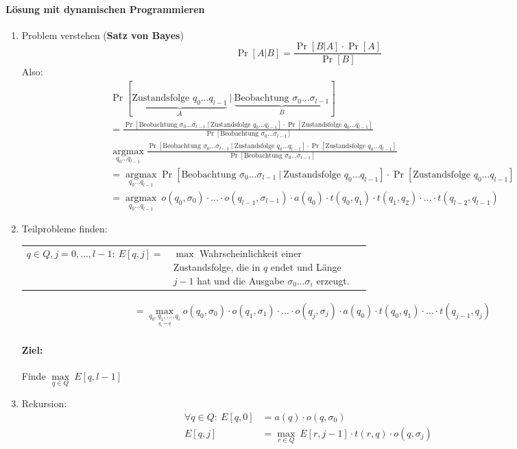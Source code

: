 \paragraph*{Lösung mit dynamischen Programmieren}
\begin{enumerate}[start=0]
\item Problem verstehen (\textbf{Satz von Bayes})
     \[\operatorname{Pr}[A|B] = \frac{\operatorname{Pr}[B|A] \cdot \operatorname{Pr}[A]}{\operatorname{Pr}[B]}\]
     Also:
     \begin{align*}
     &\operatorname{Pr}[\underbrace{\text{Zustandsfolge $q_0...q_{l-1}$}}_{A}\ |\ \underbrace{\text{Beobachtung $\sigma_0...\sigma_{l-1}$}}_{B}] \\&= \frac{\operatorname{Pr}[\text{Beobachtung $\sigma_0...\sigma_{l-1}$}\ |\ \text{Zustandsfolge $q_0...q_{l-1}$}] \cdot \operatorname{Pr}[\text{Zustandsfolge $q_0...q_{l-1}$}]}{\operatorname{Pr}[\text{Beobachtung $\sigma_0...\sigma_{l-1}$}]}\\
     &\underset{q_0...q_{l-1}}{\operatorname{argmax}} \frac{\operatorname{Pr}[\text{Beobachtung $\sigma_0...\sigma_{l-1}$}\ |\ \text{Zustandsfolge $q_0...q_{l-1}$}] \cdot \operatorname{Pr}[\text{Zustandsfolge $q_0...q_{l-1}$}]}{\operatorname{Pr}[\text{Beobachtung $\sigma_0...\sigma_{l-1}$}]} \\
     &= \underset{q_0...q_{l-1}}{\operatorname{argmax}} \operatorname{Pr}[\text{Beobachtung $\sigma_0...\sigma_{l-1}$}\ |\ \text{Zustandsfolge $q_0...q_{l-1}$}] \cdot \operatorname{Pr}[\text{Zustandsfolge $q_0...q_{l-1}$}]\\
     &= \underset{q_0...q_{l-1}}{\operatorname{argmax}}\ o(q_0,\sigma_0) \cdot ... \cdot o(q_{l-1},\sigma_{l-1}) \cdot a(q_0) \cdot 
         t(q_0,q_1) \cdot t(q_1,q_2) \cdot ... \cdot t(q_{l-2}, q_{l-1})
     \end{align*}
\item Teilprobleme finden:
\begin{center}
    \begin{tabular}{rp{0.6\linewidth}}
        $q \in Q, j = 0, ..., l-1{:}\ E[q,j] =$&$\max$ Wahrscheinlichkeit einer Zustandsfolge, die in $q$ endet und Länge $j-1$ hat und die Ausgabe $\sigma_0...\sigma_i$ erzeugt.
     \end{tabular}
\end{center}
\begin{align*}
 &= \underset{\underset{q_i = q}{q_0,q_1,...,q_i}}{\max} o(q_0,\sigma_0) \cdot o(q_1,\sigma_1) \cdot ... \cdot o(q_j, \sigma_j)
     \cdot a(q_0) \cdot t(q_0,q_1) \cdot ... \cdot t(q_{j-1}, q_j)
\end{align*}
\paragraph*{Ziel:} Finde $\underset{q \in Q}{\max}\ E[q, l-1]$
\item Rekursion:
 \begin{align*}
  \forall q \in Q{:}\ E[q, 0] &= a(q) \cdot o (q, \sigma_0) \\
                      E[q, j] &= \max\limits_{r \in Q}\ E[r, j-1] \cdot t(r,q) \cdot o(q,\sigma_j)
 \end{align*}
\end{enumerate}

